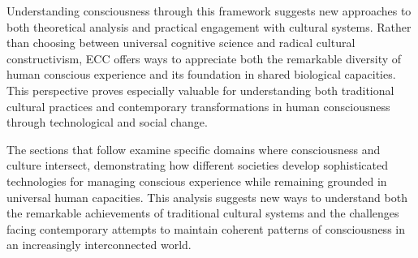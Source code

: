Understanding consciousness through this framework suggests new approaches to both theoretical analysis and practical engagement with cultural systems. Rather than choosing between universal cognitive science and radical cultural constructivism, ECC offers ways to appreciate both the remarkable diversity of human conscious experience and its foundation in shared biological capacities. This perspective proves especially valuable for understanding both traditional cultural practices and contemporary transformations in human consciousness through technological and social change.

The sections that follow examine specific domains where consciousness and culture intersect, demonstrating how different societies develop sophisticated technologies for managing conscious experience while remaining grounded in universal human capacities. This analysis suggests new ways to understand both the remarkable achievements of traditional cultural systems and the challenges facing contemporary attempts to maintain coherent patterns of consciousness in an increasingly interconnected world.








